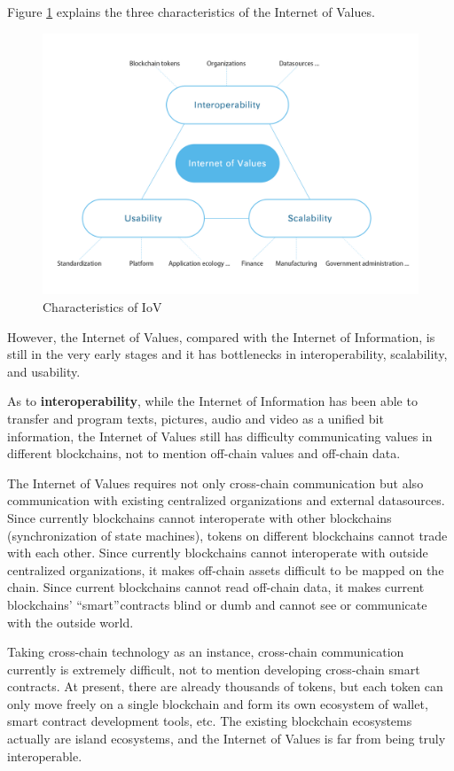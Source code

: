 \documentclass[a4paper,12pt]{article}
\begin{document}
Figure \ref {fig: Characteristics-of-IoV} explains the three characteristics of the Internet of Values.


\begin {figure} [htbp]
\centering \includegraphics [width = 5in] {pic/Characteristics-of-IoV.png}
\caption {Characteristics of IoV} \label {fig: Characteristics-of-IoV}
\end {figure}

However, the Internet of Values, compared with the Internet of Information, is still in the very early stages and it has bottlenecks in interoperability, scalability, and usability.

As to \textbf{interoperability}, while the Internet of Information has been able to transfer and program texts, pictures, audio and video as a unified bit information, the Internet of Values still has difficulty communicating values in different blockchains, not to mention off-chain values and off-chain data.

The Internet of Values requires not only cross-chain communication but also communication with existing centralized organizations and external datasources. Since currently blockchains cannot interoperate with other blockchains (synchronization of state machines), tokens on different blockchains cannot trade with each other. Since currently blockchains cannot interoperate with outside centralized organizations, it makes off-chain assets difficult to be mapped on the chain. Since current blockchains cannot read off-chain data, it makes current blockchains' “smart” contracts blind or dumb and cannot see or communicate with the outside world.

Taking cross-chain technology as an instance, cross-chain communication currently is extremely difficult, not to mention developing cross-chain smart contracts. At present, there are already thousands of tokens, but each token can only move freely on a single blockchain and form its own ecosystem of wallet, smart contract development tools, etc. The existing blockchain ecosystems actually are island ecosystems, and the Internet of Values is far from being truly interoperable.
\end{document}

